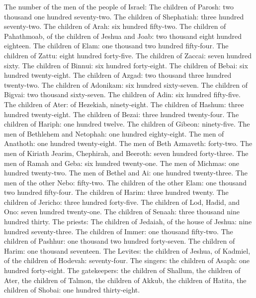 The number of the men of the people of Israel:  The children
of Parosh: two thousand one hundred seventy-two.  The
children of Shephatiah: three hundred seventy-two.  The
children of Arah: six hundred fifty-two.  The children of
Pahathmoab, of the children of Jeshua and Joab: two thousand eight
hundred eighteen.  The children of Elam: one thousand two
hundred fifty-four.  The children of Zattu: eight hundred
forty-five.  The children of Zaccai: seven hundred sixty.
 The children of Binnui: six hundred forty-eight.
 The children of Bebai: six hundred twenty-eight.
 The children of Azgad: two thousand three hundred
twenty-two.  The children of Adonikam: six hundred
sixty-seven.  The children of Bigvai: two thousand
sixty-seven.  The children of Adin: six hundred fifty-five.
 The children of Ater: of Hezekiah, ninety-eight.
 The children of Hashum: three hundred twenty-eight.
 The children of Bezai: three hundred twenty-four.
 The children of Hariph: one hundred twelve. 
The children of Gibeon: ninety-five.  The men of Bethlehem
and Netophah: one hundred eighty-eight.  The men of
Anathoth: one hundred twenty-eight.  The men of Beth
Azmaveth: forty-two.  The men of Kiriath Jearim, Chephirah,
and Beeroth: seven hundred forty-three.  The men of Ramah
and Geba: six hundred twenty-one.  The men of Michmas: one
hundred twenty-two.  The men of Bethel and Ai: one hundred
twenty-three.  The men of the other Nebo: fifty-two.
 The children of the other Elam: one thousand two hundred
fifty-four.  The children of Harim: three hundred twenty.
 The children of Jericho: three hundred forty-five.
 The children of Lod, Hadid, and Ono: seven hundred
twenty-one.  The children of Senaah: three thousand nine
hundred thirty.  The priests: The children of Jedaiah, of
the house of Jeshua: nine hundred seventy-three.  The
children of Immer: one thousand fifty-two.  The children of
Pashhur: one thousand two hundred forty-seven.  The
children of Harim: one thousand seventeen.  The Levites:
the children of Jeshua, of Kadmiel, of the children of Hodevah:
seventy-four.  The singers: the children of Asaph: one
hundred forty-eight.  The gatekeepers: the children of
Shallum, the children of Ater, the children of Talmon, the children of
Akkub, the children of Hatita, the children of Shobai: one hundred
thirty-eight.

